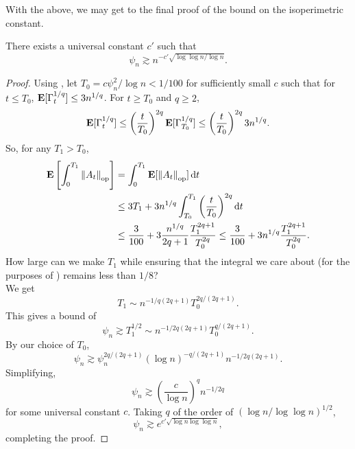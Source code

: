 		With the above, we may get to the final proof of the bound on the isoperimetric constant.

		\begin{ftheo}
			There exists a universal constant $c'$ such that
			\[ \psi_n \gtrsim n^{-c'\sqrt{\log \log n / \log n}}. \]
		\end{ftheo}
		\begin{proof}
			Using  , let $T_0 = c \psi_n^2 / \log n < 1 / 100$ for sufficiently small $c$ such that for $t\leq T_0$, $\textbf{E}[\Gamma_t^{1/q}] \leq 3n^{1/q}$. For $t \geq T_0$ and $q \geq 2$,
			\[ \textbf{E}[\Gamma_t^{1/q}] \leq \left(\frac{t}{T_0}\right)^{2q} \textbf{E}[\Gamma_{T_0}^{1/q}] \leq \left(\frac{t}{T_0}\right)^{2q} 3n^{1/q}. \]
			So, for any $T_1 > T_0$,
			\begin{align*}
				\textbf{E}\left[ \int_0^{T_1} \left\lVert A_t\right\rVert_{\text{op}} \right] &= \int_0^{T_1} \textbf{E}[\left\lVert A_t\right\rVert_{\text{op}}] \operatorname{d}\!{t} \\
					&\leq 3T_1 + 3n^{1/q} \int_{T_0}^{T_1} \left(\frac{t}{T_0}\right)^{2q} \operatorname{d}\!{t} \\
					&\leq \frac{3}{100} + 3 \frac{ n^{1/q} }{2q+1} \frac{T_1^{2q+1}}{T_0^{2q}} \leq \frac{3}{100} + 3 n^{1/q} \frac{T_1^{2q+1}}{T_0^{2q}}.
			\end{align*}
			How large can we make $T_1$ while ensuring that the integral we care about (for the purposes of ) remains less than $1/8$?\\
			We get
			\[ T_1 \sim n^{-1/q(2q+1)} T_0^{2q/(2q+1)}. \]
			This gives a bound of
			\[ \psi_n \gtrsim T_1^{1/2} \sim n^{-1/2q(2q+1)} T_0^{q/(2q+1)}. \]
			By our choice of $T_0$,
			\[ \psi_n \gtrsim \psi_n^{2q/(2q+1)} (\log n)^{-q/(2q+1)} n^{-1/2q(2q+1)}. \]
			Simplifying,
			\[ \psi_n \gtrsim \left(\frac{c}{\log n}\right)^{q} n^{-1/2q} \]
			for some universal constant $c$. Taking $q$ of the order of $\left(\log n / \log \log n\right)^{1/2}$,
			\[ \psi_n \gtrsim e^{c' \sqrt{\log n \log \log n} }, \]
			completing the proof.
		\end{proof}



